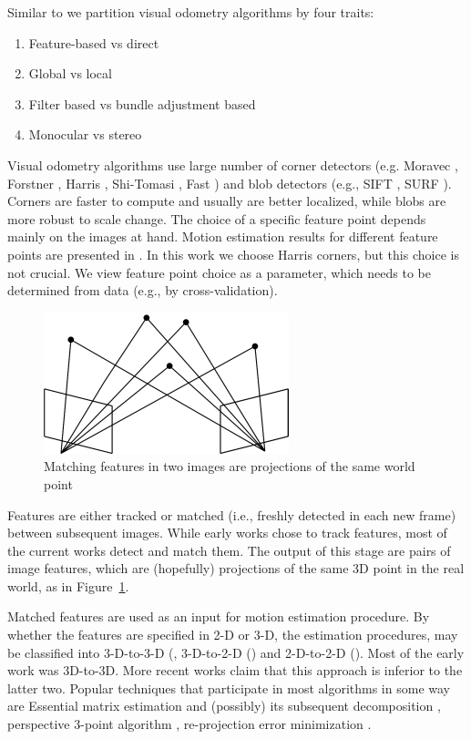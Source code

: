 \documentclass[runningheads]{llncs}
\begin{document}
Similar to \cite{Persson2015} we partition visual odometry algorithms
by four traits:
\begin{enumerate}
\item Feature-based vs direct
\item Global vs local
\item Filter based vs bundle adjustment based
\item Monocular vs stereo
\end{enumerate}

Visual odometry algorithms use large number of corner detectors
(e.g. Moravec \cite{Moravec1980}, Forstner \cite{Forstner}, Harris
\cite{Harris1987}, Shi-Tomasi \cite{Shi1994}, Fast \cite{Rosten2006})
and blob detectors (e.g., SIFT \cite{Lowe2004}, SURF
\cite{Bay2006}). Corners are faster to compute and usually are better
localized, while blobs are more robust to scale change. The choice of
a specific feature point depends mainly on the images at hand.  Motion
estimation results for different feature points are presented in
\cite{Govender2009}. In this work we choose Harris \cite{Harris1987}
corners, but this choice is not crucial. We view feature point choice
as a parameter, which needs to be determined from data (e.g., by
cross-validation).

\begin{figure}
  \centering
  \includegraphics{5ptm2}
  \caption{Matching features in two images are projections of the same
    world point}
  \label{fig:5ptm}
\end{figure}

Features are either tracked \cite{Hedborg2009} or matched
\cite{Geiger2011} (i.e., freshly detected in each new frame) between
subsequent images. While early works chose to track features, most of
the current works detect and match them. The output of this stage are
pairs of image features, which are (hopefully) projections of the same
3D point in the real world, as in Figure~\ref{fig:5ptm}.

Matched features are used as an input for motion estimation procedure.
By whether the features are specified in 2-D or 3-D, the estimation
procedures, may be classified into 3-D-to-3-D (\cite{Milella2006},
3-D-to-2-D (\cite{Geiger2011}) and 2-D-to-2-D
(\cite{Nister2004}). Most of the early work was 3D-to-3D.  More recent
works \cite{Nister2004} claim that this approach is inferior to the
latter two. Popular techniques that participate in most algorithms in
some way are Essential matrix estimation and (possibly) its subsequent
decomposition \cite{Nister2004}, perspective 3-point algorithm
\cite{Kneip1991}, re-projection error minimization \cite{Geiger2011}.
\end{document}
